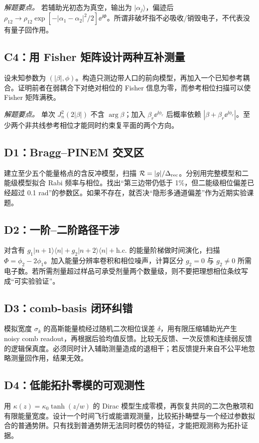 \textit{解题要点。} 若辅助光初态为真空，输出为 $|\alpha_j\rangle$，偏迹后 $\rho_{12}\to\rho_{12}\exp[-|\alpha_1-\alpha_2|^2/2]\ee^{\ii\Phi}$。所谓非破坏指不必吸收/销毁电子，不代表没有量子回作用。

\subsection*{C4：用 Fisher 矩阵设计两种互补测量}
设未知参数为 $(|\beta|,\phi)$。构造只测边带人口的前向模型，再加入一个已知参考耦合。证明前者在弱耦合下对绝对相位的 Fisher 信息为零，而参考相位扫描可以使 Fisher 矩阵满秩。

\textit{解题要点。} 单次 $J_n^2(2|\beta|)$ 不含 $\arg\beta$；加入 $\beta_r \ee^{\ii\phi_r}$ 后概率依赖 $|\beta+\beta_r \ee^{\ii\phi_r}|$。至少两个非共线参考相位才能同时约束复平面的两个方向。

\medskip
\subsection*{D1：Bragg--PINEM 交叉区}
建立至少五个能量格点的含反冲模型，扫描 $\mathcal R=|g|/\Delta_{\rm rec}$。分别用完整模型和二能级模型拟合 Rabi 频率与相位。找出“第三边带仍低于 1\%，但二能级相位偏差已经超过 0.1 rad”的参数区。如果不存在，就否决“隐形多通道偏差”作为近期实验课题。

\subsection*{D2：一阶--二阶路径干涉}
对含有 $g_1|n+1\rangle\langle n|+g_2|n+2\rangle\langle n|+\mathrm{h.c.}$ 的能量阶梯做时间演化，扫描 $\Phi=\phi_2-2\phi_1$。加入能量分辨率卷积和相位噪声，计算区分 $g_2=0$ 与 $g_2\neq0$ 所需电子数。若所需剂量超过样品可承受剂量两个数量级，则不要把理想相位条纹写成“可实验验证”。

\subsection*{D3：comb-basis 闭环纠错}
模拟宽度 $\sigma_k$ 的高斯能量梳经过随机二次相位误差 $\delta$，用有限压缩辅助光产生 noisy comb readout，再根据后验均值反馈。比较无反馈、一次反馈和连续弱反馈的逻辑保真度。必须同时计入辅助测量造成的退相干；若反馈提升来自不公平地忽略测量回作用，结果无效。

\subsection*{D4：低能拓扑零模的可观测性}
用 $\kappa(z)=\kappa_0\tanh(z/w)$ 的 Dirac 模型生成零模，再恢复共同的二次色散项和有限能量宽度。设计一个时间飞行或能谱观测量，比较拓扑畴壁与一个经过参数拟合的普通势阱。只有找到普通势阱无法同时模仿的特征，才能把观测称为拓扑证据。

